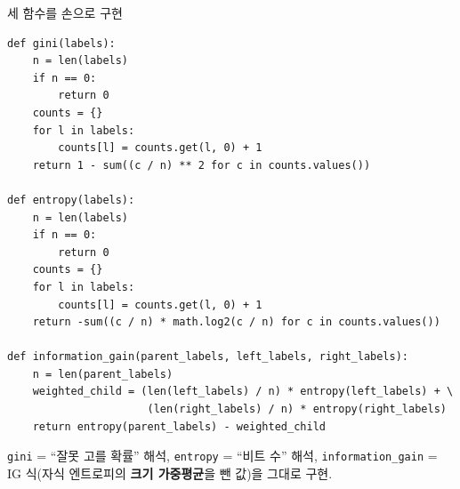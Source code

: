 \begin{frame}[fragile]{세 함수를 손으로 구현}
\begin{lstlisting}
def gini(labels):
    n = len(labels)
    if n == 0:
        return 0
    counts = {}
    for l in labels:
        counts[l] = counts.get(l, 0) + 1
    return 1 - sum((c / n) ** 2 for c in counts.values())

def entropy(labels):
    n = len(labels)
    if n == 0:
        return 0
    counts = {}
    for l in labels:
        counts[l] = counts.get(l, 0) + 1
    return -sum((c / n) * math.log2(c / n) for c in counts.values())

def information_gain(parent_labels, left_labels, right_labels):
    n = len(parent_labels)
    weighted_child = (len(left_labels) / n) * entropy(left_labels) + \
                      (len(right_labels) / n) * entropy(right_labels)
    return entropy(parent_labels) - weighted_child
\end{lstlisting}
  {\footnotesize \texttt{gini} = ``잘못 고를 확률'' 해석, \texttt{entropy} =
  ``비트 수'' 해석, \texttt{information\_gain} = IG 식(자식 엔트로피의
  \textbf{크기 가중평균}을 뺀 값)을 그대로 구현.}
\end{frame}
